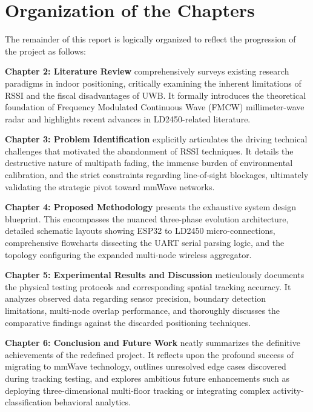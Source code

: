 \section{Organization of the Chapters}

The remainder of this report is logically organized to reflect the progression of the project as follows:\par

\textbf{Chapter 2: Literature Review} comprehensively surveys existing research paradigms in indoor positioning, critically examining the inherent limitations of RSSI and the fiscal disadvantages of UWB. It formally introduces the theoretical foundation of Frequency Modulated Continuous Wave (FMCW) millimeter-wave radar and highlights recent advances in LD2450-related literature.\par

\textbf{Chapter 3: Problem Identification} explicitly articulates the driving technical challenges that motivated the abandonment of RSSI techniques. It details the destructive nature of multipath fading, the immense burden of environmental calibration, and the strict constraints regarding line-of-sight blockages, ultimately validating the strategic pivot toward mmWave networks.\par

\textbf{Chapter 4: Proposed Methodology} presents the exhaustive system design blueprint. This encompasses the nuanced three-phase evolution architecture, detailed schematic layouts showing ESP32 to LD2450 micro-connections, comprehensive flowcharts dissecting the UART serial parsing logic, and the topology configuring the expanded multi-node wireless aggregator.\par

\textbf{Chapter 5: Experimental Results and Discussion} meticulously documents the physical testing protocols and corresponding spatial tracking accuracy. It analyzes observed data regarding sensor precision, boundary detection limitations, multi-node overlap performance, and thoroughly discusses the comparative findings against the discarded positioning techniques.\par

\textbf{Chapter 6: Conclusion and Future Work} neatly summarizes the definitive achievements of the redefined project. It reflects upon the profound success of migrating to mmWave technology, outlines unresolved edge cases discovered during tracking testing, and explores ambitious future enhancements such as deploying three-dimensional multi-floor tracking or integrating complex activity-classification behavioral analytics.
